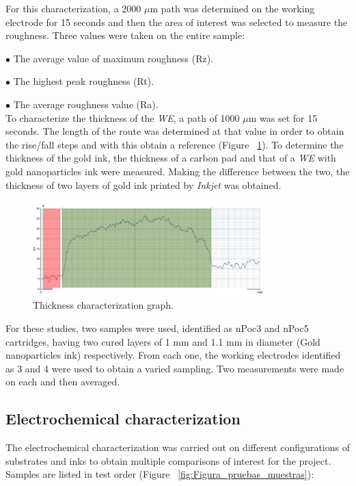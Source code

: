 For this characterization, a 2000 $\mu$m path was determined on the working electrode for 15 seconds and then the area of interest was selected to measure the roughness. Three values were taken on the entire sample:

$\bullet$ The average value of maximum roughness (Rz).

$\bullet$ The highest peak roughness (Rt).

$\bullet$ The average roughness value (Ra).
\\

To characterize the thickness of the \emph{WE}, a path of 1000 $\mu$m was set for 15 seconds. The length of the route was determined at that value in order to obtain the rise/fall steps and with this obtain a reference (Figure ~\ref{fig:Figura_grafico_perfilometro}). To determine the thickness of the gold ink, the thickness of a carbon pad and that of a \emph{WE} with gold nanoparticles ink were measured. Making the difference between the two, the thickness of two layers of gold ink printed by \textit{Inkjet} was obtained.

\begin{figure}[H]
  \centering
    \includegraphics[width=0.8\textwidth]{Figures/Figura_grafico_perfilometro}
  \caption{Thickness characterization graph.}
  \label{fig:Figura_grafico_perfilometro}
\end{figure}

For these studies, two samples were used, identified as nPoc3 and nPoc5 cartridges, having two cured layers of 1 mm and 1.1 mm in diameter (Gold nanoparticles ink) respectively. From each one, the working electrodes identified as 3 and 4 were used to obtain a varied sampling. Two measurements were made on each and then averaged.

\subsection{Electrochemical characterization}
The electrochemical characterization was carried out on different configurations of substrates and inks to obtain multiple comparisons of interest for the project. Samples are listed in test order (Figure ~\ref{fig:Figura_pruebas_muestras}):

